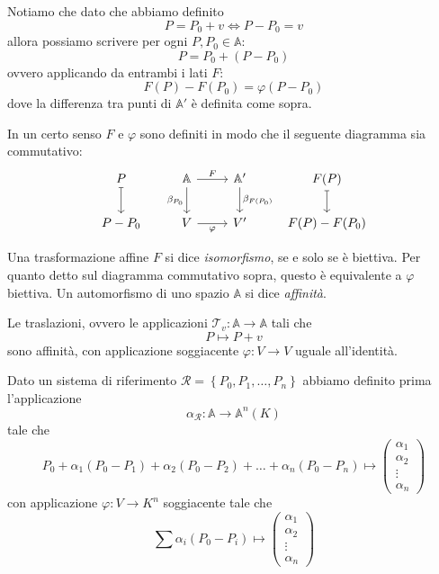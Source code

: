 \documentclass[11pt]{scrartcl}
\begin{document}
   	 \begin{remark}
   	 	Notiamo che dato che abbiamo definito
   	 	$$P=P_0+v \iff P-P_0=v$$
   	 	allora possiamo scrivere per ogni $P,P_0\in \mathbb{A}$:
   	 	$$P=P_0+(P-P_0)$$
   	 	ovvero applicando da entrambi i lati $F$:
   	 	$$F(P)-F(P_0)=\varphi(P-P_0)$$
   	 	dove la differenza tra punti di $\mathbb{A}'$ è definita come sopra.
   	 \end{remark}
   	 In un certo senso $F$ e $\varphi$ sono definiti in modo che il seguente diagramma sia commutativo:
   	 $$
   	 \begin{tikzcd}
   	 	P \arrow[d,maps to] &\mathbb{A}\arrow[d,"\beta_{P_0}",swap] \arrow[r,"F"]&  \mathbb{A}'\arrow[d,"\beta_{F(P_0)}"] & F(P)\arrow[d,maps to]\\
   	 	P-P_0&V \arrow[r,"\varphi",swap]& V'& F(P)-F(P_0)
   	 \end{tikzcd}
   	 $$
   	 \begin{definition}[Affinità]
   	 	Una trasformazione affine $F$ si dice \textit{isomorfismo}, se e solo se è biettiva. Per quanto detto sul diagramma commutativo sopra, questo è equivalente a $\varphi$ biettiva. Un automorfismo di uno spazio $\mathbb{A}$ si dice \textit{affinità}.
   	 \end{definition}
   	 \begin{example}[Traslazioni]
   	 	Le traslazioni, ovvero le applicazioni $\mathcal{T}_v:\mathbb{A}\to\mathbb{A}$ tali che
   	 	$$P\mapsto P+v$$
   	 	sono affinità, con applicazione soggiacente $\varphi:V\to V$ uguale all'identità.
   	 \end{example}
   	 \begin{example}
   	 	Dato un sistema di riferimento $\mathcal{R}=\left\{P_0,P_1,\dots,P_n\right\}$ abbiamo definito prima l'applicazione 
   	 	$$\alpha_\mathcal{R}:\mathbb{A}\to\mathbb{A}^n(K)$$
   	 	tale che 
   	 	$$P_0+\alpha_1(P_0-P_1)+\alpha_2(P_0-P_2)+\dots+\alpha_n(P_0-P_n)\mapsto \begin{pmatrix}
   	 		\alpha_1 \\
   	 		\alpha_2 \\
   	 		\vdots  \\
   	 		\alpha_n
   	 	\end{pmatrix}
   	 	$$
   	 	con applicazione $\varphi:V\to K^n$ soggiacente tale che
   		$$\sum \alpha_i(P_0-P_i)\mapsto \begin{pmatrix}
   			\alpha_1 \\
   			\alpha_2 \\
   			\vdots  \\
   			\alpha_n
   		\end{pmatrix}$$
   	 \end{example}
\end{document}

